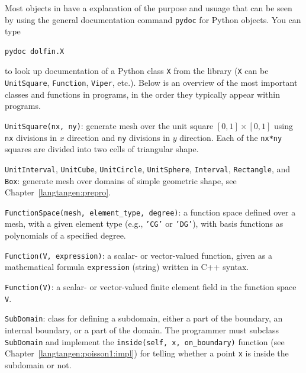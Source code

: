 Most objects in \fenics{} have a explanation of the purpose and usuage
that can be seen by using the general documentation command
{\fontsize{12pt}{12pt}\texttt{pydoc}} for Python objects. You can type
\begin{Verbatim}[fontsize=\fontsize{10pt}{10pt},tabsize=8,baselinestretch=1.05,
fontfamily=tt,xleftmargin=7mm]
pydoc dolfin.X
\end{Verbatim}
\noindent
to look up documentation of a Python class {\fontsize{12pt}{12pt}\texttt{X}} from the \dolfin{}
library ({\fontsize{12pt}{12pt}\texttt{X}} can be {\fontsize{12pt}{12pt}\texttt{UnitSquare}}, {\fontsize{12pt}{12pt}\texttt{Function}},
{\fontsize{12pt}{12pt}\texttt{Viper}}, etc.). Below is an overview of the most important classes
and functions
in \fenics{} programs, in the order they typically appear within programs.\gln

{\fontsize{12pt}{12pt}\texttt{UnitSquare(nx, ny)}}: generate mesh over the unit square
$[0,1]\times [0,1]$ using {\fontsize{12pt}{12pt}\texttt{nx}} divisions in $x$ direction and
{\fontsize{12pt}{12pt}\texttt{ny}} divisions in $y$ direction. Each of the {\fontsize{12pt}{12pt}\texttt{nx*ny}} squares
are divided into two cells of triangular shape.\gln

{\fontsize{12pt}{12pt}\texttt{UnitInterval}}, {\fontsize{12pt}{12pt}\texttt{UnitCube}}, {\fontsize{12pt}{12pt}\texttt{UnitCircle}}, {\fontsize{12pt}{12pt}\texttt{UnitSphere}},
{\fontsize{12pt}{12pt}\texttt{Interval}}, {\fontsize{12pt}{12pt}\texttt{Rectangle}}, and {\fontsize{12pt}{12pt}\texttt{Box}}: generate mesh over
domains of simple geometric shape, see Chapter~\ref{langtangen:prepro}.\gln

{\fontsize{12pt}{12pt}\verb!FunctionSpace(mesh, element_type, degree)!}:
a function space defined over a mesh, with a given element type
(e.g., {\fontsize{12pt}{12pt}\texttt{'CG'}} or {\fontsize{12pt}{12pt}\texttt{'DG'}}), with basis functions as polynomials of
a specified degree.\gln

{\fontsize{12pt}{12pt}\texttt{Function(V, expression)}}: a scalar- or vector-valued function, given as a
mathematical formula {\fontsize{12pt}{12pt}\texttt{expression}} (string) written in C++ syntax.\gln

{\fontsize{12pt}{12pt}\texttt{Function(V)}}: a scalar- or vector-valued finite element field in
the function space {\fontsize{12pt}{12pt}\texttt{V}}.\gln

{\fontsize{12pt}{12pt}\texttt{SubDomain}}: class for defining a subdomain, either a part of the
boundary, an internal boundary, or a part of the domain.
The programmer must subclass {\fontsize{12pt}{12pt}\texttt{SubDomain}} and implement the
{\fontsize{12pt}{12pt}\verb!inside(self, x, on_boundary)!} function (see Chapter~\ref{langtangen:poisson1:impl}) for telling whether a point {\fontsize{12pt}{12pt}\texttt{x}} is inside the subdomain or not.
\gln

